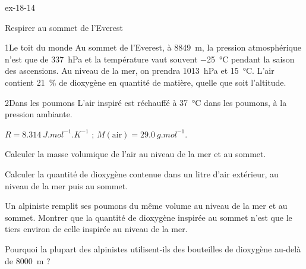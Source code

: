 \begin{blocLivre}{ex-18-14}
\begin{exercice}[3]{Respirer au sommet de l'Everest}
\begin{docu}{1}{Le toit du monde}
Au sommet de l'Everest, à \qty{8849}{m}, la pression atmosphérique n'est que de \qty{337}{hPa} et la température vaut
souvent \qty{-25}{\degreeCelsius} pendant la saison des ascensions. Au niveau de la mer, on prendra \qty{1013}{hPa} et
\qty{15}{\degreeCelsius}. L'air contient 21~\% de dioxygène en quantité de matière, quelle que soit l'altitude.
\end{docu}
\begin{docu}{2}{Dans les poumons}
L'air inspiré est réchauffé à \qty{37}{\degreeCelsius} dans les poumons, à la pression ambiante.
\end{docu}
\begin{donnees}
$R=\qty{8,314}{J.mol^{-1}.K^{-1}}$ ; $M(\text{air})=\qty{29,0}{g.mol^{-1}}$.
\end{donnees}
\begin{questions}
\item Calculer la masse volumique de l'air au niveau de la mer et au sommet.
\item Calculer la quantité de dioxygène contenue dans un litre d'air extérieur, au niveau de la mer puis au sommet.
\item \initiative Un alpiniste remplit ses poumons du même volume au niveau de la mer et au sommet. Montrer que la quantité
de dioxygène inspirée au sommet n'est que le tiers environ de celle inspirée au niveau de la mer.
\item Pourquoi la plupart des alpinistes utilisent-ils des bouteilles de dioxygène au-delà de \qty{8000}{m} ?
\end{questions}
\end{exercice}
\end{blocLivre}
